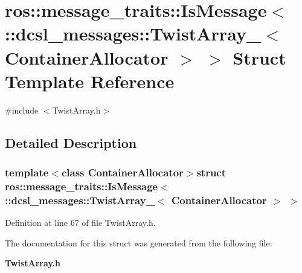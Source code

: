 \section{ros\-:\-:message\-\_\-traits\-:\-:\-Is\-Message$<$ \-:\-:dcsl\-\_\-messages\-:\-:\-Twist\-Array\-\_\-$<$ \-Container\-Allocator $>$ $>$ \-Struct \-Template \-Reference}
\label{structros_1_1message__traits_1_1IsMessage_3_01_1_1dcsl__messages_1_1TwistArray___3_01ContainerAllocator_01_4_01_4}


{\ttfamily \#include $<$\-Twist\-Array.\-h$>$}



\subsection{\-Detailed \-Description}
\subsubsection*{template$<$class Container\-Allocator$>$struct ros\-::message\-\_\-traits\-::\-Is\-Message$<$ \-::dcsl\-\_\-messages\-::\-Twist\-Array\-\_\-$<$ Container\-Allocator $>$ $>$}



\-Definition at line 67 of file \-Twist\-Array.\-h.



\-The documentation for this struct was generated from the following file\-:\begin{DoxyCompactItemize}
\item 
{\bf \-Twist\-Array.\-h}\end{DoxyCompactItemize}
